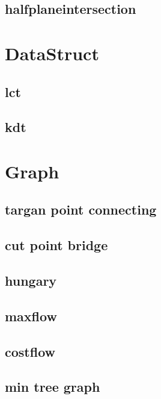 \documentclass[10pt,a4paper]{article}
\begin{document}
\begin{spacing}{0.5}
		\subsection{halfplaneintersection}
			
	\section{DataStruct}
		\subsection{lct}
			
		\subsection{kdt}
			
	\section{Graph}
		\subsection{targan point connecting}
			
		\subsection{cut point bridge}
			
		\subsection{hungary}
			
		\subsection{maxflow}
			
		\subsection{costflow}
			
		\subsection{min tree graph}
			

\end{spacing}
\end{document}
